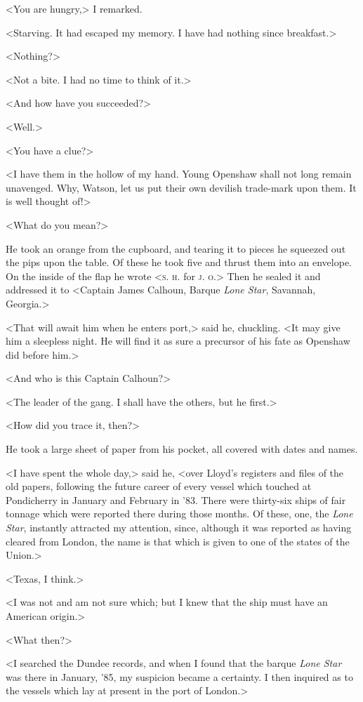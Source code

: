 <You are hungry,> I remarked.

<Starving. It had escaped my memory. I have had nothing since breakfast.>

<Nothing?>

<Not a bite. I had no time to think of it.>

<And how have you succeeded?>

<Well.>

<You have a clue?>

<I have them in the hollow of my hand. Young Openshaw shall not long remain unavenged. Why, Watson, let us put their own devilish trade-mark upon them. It is well thought of!>

<What do you mean?>

He took an orange from the cupboard, and tearing it to pieces he squeezed out the pips upon the table. Of these he took five and thrust them into an envelope. On the inside of the flap he wrote <\textsc{s. h.} for \textsc{j. o.}> Then he sealed it and addressed it to <Captain James Calhoun, Barque \textit{Lone Star}, Savannah, Georgia.>

<That will await him when he enters port,> said he, chuckling. <It may give him a sleepless night. He will find it as sure a precursor of his fate as Openshaw did before him.>

<And who is this Captain Calhoun?>

<The leader of the gang. I shall have the others, but he first.>

<How did you trace it, then?>

He took a large sheet of paper from his pocket, all covered with dates and names.

<I have spent the whole day,> said he, <over Lloyd's registers and files of the old papers, following the future career of every vessel which touched at Pondicherry in January and February in '83. There were thirty-six ships of fair tonnage which were reported there during those months. Of these, one, the \textit{Lone Star}, instantly attracted my attention, since, although it was reported as having cleared from London, the name is that which is given to one of the states of the Union.>

<Texas, I think.>

<I was not and am not sure which; but I knew that the ship must have an American origin.>

<What then?>

<I searched the Dundee records, and when I found that the barque \textit{Lone Star} was there in January, '85, my suspicion became a certainty. I then inquired as to the vessels which lay at present in the port of London.>

